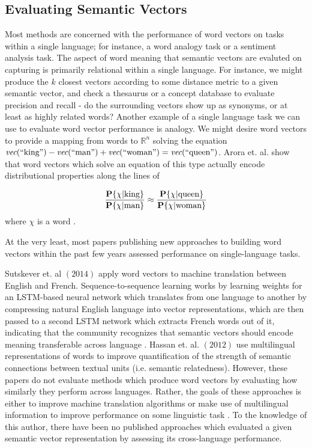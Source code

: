 \documentclass[12pt, usenames]{article}
\theoremstyle{definition}
\theoremstyle{definition}
\theoremstyle{definition}
\newcommand{\txt}[1]
{\textnormal{#1}}
\newcommand{\prob}[1]
{\textbf{P}\{{#1}\}}
\begin{document}
\subsection{Evaluating Semantic Vectors}

Most methods are concerned with the performance of word vectors on tasks within a single language; for instance, a word analogy task or a sentiment analysis task. The aspect of word meaning that semantic vectors are evaluted on capturing is primarily relational within a single language. For instance, we might produce the $k$ closest vectors according to some distance metric to a given semantic vector, and check a thesaurus or a concept database to evaluate precision and recall - do the surrounding vectors show up as synonyms, or at least as highly related words? Another example of a single language task we can use to evaluate word vector performance is analogy. We might desire word vectors to provide a mapping from words to $\mathbb{R}^n$ solving the equation $\textit{vec}(``\txt{king}") - \textit{vec}(``\txt{man}") + \textit{vec}(``\txt{woman}") = \textit{vec}(``\txt{queen}")$. Arora et. al. show that word vectors which solve an equation of this type actually encode distributional properties along the lines of 

\begin{align}
\frac{\prob{\chi |\txt{king}}}{\prob{\chi | \txt{man}}} \approx \frac{\prob{\chi|\txt{queen}}}{\prob{\chi | \txt{woman}}}
\end{align}
where $\chi$ is a word \cite{Arora}.

At the very least, most papers publishing new approaches to building word vectors within the past few years assessed performance on single-language tasks.

Sutskever et. al $(2014)$ apply word vectors to machine translation between English and French.
Sequence-to-sequence learning works by learning weights for an LSTM-based neural network which translates from one language to another by compressing natural English language into vector representations, which are then passed to a second LSTM network which extracts French words out of it, indicating that the community recognizes that semantic vectors should encode meaning transferable across language \cite{Sutskever}. 
Hassan et. al. $(2012)$ use multilingual representations of words to improve quantification of the strength of semantic connections between textual units (i.e. semantic relatedness). However, these papers do not evaluate methods which produce word vectors by evaluating how similarly they perform across languages. Rather, the goals of these approaches is either to improve machine translation algorithms or make use of multilingual information to improve performance on some linguistic task \cite{Hassan}. 
To the knowledge of this author, there have been no published approaches which evaluated a given semantic vector representation by assessing its cross-language performance. 
\end{document}
